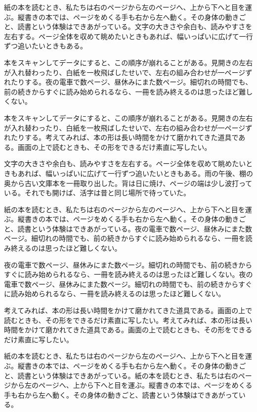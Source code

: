 \documentclass[a5paper,11pt]{ltjtbook}
\begin{document}
紙の本を読むとき、私たちは右のページから左のページへ、上から下へと目を運ぶ。縦書きの本では、ページをめくる手も右から左へ動く。その身体の動きごと、読書という体験はできあがっている。文字の大きさや余白も、読みやすさを左右する。ページ全体を収めて眺めたいときもあれば、幅いっぱいに広げて一行ずつ追いたいときもある。

本をスキャンしてデータにすると、この順序が崩れることがある。見開きの左右が入れ替わったり、白紙を一枚飛ばしたせいで、左右の組み合わせが一ページずれたりする。夜の電車で数ページ、昼休みにまた数ページ。細切れの時間でも、前の続きからすぐに読み始められるなら、一冊を読み終えるのは思ったほど難しくない。

本をスキャンしてデータにすると、この順序が崩れることがある。見開きの左右が入れ替わったり、白紙を一枚飛ばしたせいで、左右の組み合わせが一ページずれたりする。考えてみれば、本の形は長い時間をかけて磨かれてきた道具である。画面の上で読むときも、その形をできるだけ素直に写したい。

文字の大きさや余白も、読みやすさを左右する。ページ全体を収めて眺めたいときもあれば、幅いっぱいに広げて一行ずつ追いたいときもある。雨の午後、棚の奥から古い文庫本を一冊取り出した。背は日に焼け、ページの端は少し波打っている。それでも開けば、活字は昔と同じ場所で待っていた。

紙の本を読むとき、私たちは右のページから左のページへ、上から下へと目を運ぶ。縦書きの本では、ページをめくる手も右から左へ動く。その身体の動きごと、読書という体験はできあがっている。夜の電車で数ページ、昼休みにまた数ページ。細切れの時間でも、前の続きからすぐに読み始められるなら、一冊を読み終えるのは思ったほど難しくない。

夜の電車で数ページ、昼休みにまた数ページ。細切れの時間でも、前の続きからすぐに読み始められるなら、一冊を読み終えるのは思ったほど難しくない。夜の電車で数ページ、昼休みにまた数ページ。細切れの時間でも、前の続きからすぐに読み始められるなら、一冊を読み終えるのは思ったほど難しくない。

考えてみれば、本の形は長い時間をかけて磨かれてきた道具である。画面の上で読むときも、その形をできるだけ素直に写したい。考えてみれば、本の形は長い時間をかけて磨かれてきた道具である。画面の上で読むときも、その形をできるだけ素直に写したい。

紙の本を読むとき、私たちは右のページから左のページへ、上から下へと目を運ぶ。縦書きの本では、ページをめくる手も右から左へ動く。その身体の動きごと、読書という体験はできあがっている。紙の本を読むとき、私たちは右のページから左のページへ、上から下へと目を運ぶ。縦書きの本では、ページをめくる手も右から左へ動く。その身体の動きごと、読書という体験はできあがっている。
\end{document}

